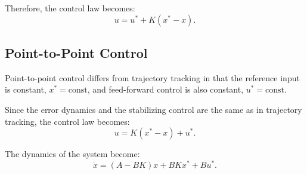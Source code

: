 Therefore, the control law becomes:
\[u = u^* + K(x^* - x).\]

\subsection*{Point-to-Point Control}

Point-to-point control differs from trajectory tracking in that the reference input is constant, \(x^* = \text{const}\), and feed-forward control is also constant, \(u^* = \text{const}\).

Since the error dynamics and the stabilizing control are the same as in trajectory tracking, the control law becomes:
\[u = K(x^* - x) + u^*.\]

The dynamics of the system become:
\[\dot{x} = (A - BK)x + BKx^* + Bu^*.\]